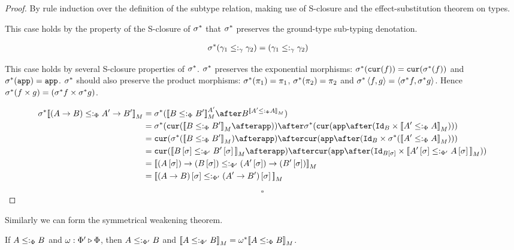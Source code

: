 \documentclass{Report}
\begin{document}
\begin{proof}
    By rule induction over the definition of the subtype relation, making use of S-closure and the effect-substitution theorem on types.


This case holds by the property of the S-closure of $\sigma^*$ that $\sigma^*$ preserves the ground-type sub-typing denotation.

\begin{align}
    \sigma^*(\gamma_1\leq:_\gamma\gamma_2) &= (\gamma_1\leq:_\gamma\gamma_2)
\end{align}




This case holds by several S-closure properties of $\sigma^*$. $\sigma^*$ preserves the exponential morphisms: $\sigma^*(\texttt{cur}(f)) = \texttt{cur}(\sigma^*(f))$ and $\sigma^*(\texttt{app}) = \texttt{app}$. $\sigma^*$ should also preserve the product morphisms: $\sigma^*(\pi_1) = \pi_1$, $\sigma^*(\pi_2) = \pi_2$ and $\sigma^*\left\langle f, g\right\rangle = \left\langle\sigma^* f, \sigma^* g\right\rangle$. Hence $\sigma^*(f \times g) = (\sigma^* f \times \sigma^* g)$.

\begin{align}
    \si\star\deno{(\ab)\subtypep\fntype{A'}{B'}} &= \si\star(\deno{B\subtypep B'}^{A'}\after B^{\deno{A'\subtypep A}})\\
    &= \si\star(\cur{\deno{B\subtypep B'}\after\app})\after\si\star(\cur{\app\after(\Id{B}\times\deno{A'\subtypep A})})\\
    & = \cur{\si\star(\deno{B\subtypep B'})\after\app}\after\cur{\app\after(\Id{B}\times\si\star(\deno{A'\subtypep A}))}\\
    & = \cur{\deno{B\ssi\subtypepp B'\ssi}\after\app}\after\cur{\app\after(\Id{B\ssi}\times\deno{A'\ssi\subtypepp A\ssi})}\\
    &= \deno{\fntype{(A\ssi)}{(B\ssi)}\subtypepp\fntype{(A'\ssi)}{(B'\ssi)}}\\
    &= \deno{(\ab)\ssi\subtypepp(\fntype{A'}{B'})\ssi}
\end{align}


$$\square$$
\end{proof}


Similarly we can form the symmetrical weakening theorem.

\begin{theorem}
    If $A \leq:_\Phi B$ and $\omega : \Phi' \triangleright \Phi$, then $A \leq:_{\Phi'} B$ and ${\bf [\![}A\leq:_{\Phi'} B{\bf ]\!]}_M = \omega^*{\bf [\![}A\leq:_\Phi B{\bf ]\!]}_M$.
\end{theorem}
\end{document}
